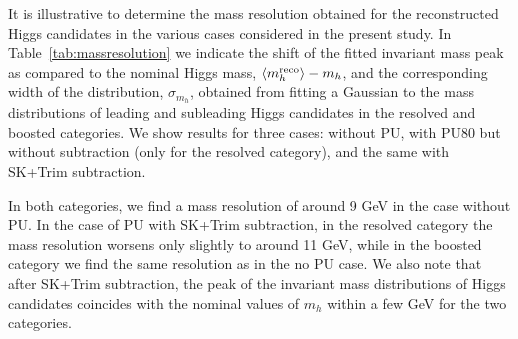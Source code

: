 It is illustrative to determine
the mass resolution obtained for the
reconstructed Higgs candidates in the various cases considered in
the present study.
%
In Table~\ref{tab:massresolution}
we indicate the shift of the fitted invariant mass peak as compared
to the nominal Higgs mass, $\left\langle m_h^{\rm reco}\right\rangle-m_h$,
and the corresponding width of the distribution, $\sigma_{m_h}$,
obtained from fitting a Gaussian to the mass distributions
of leading and subleading Higgs candidates in
the resolved and boosted categories.
        We show results for three cases: without PU, with PU80
        but without subtraction (only for the
        resolved category), and the same with SK+Trim subtraction.

        In both categories,
        we find a mass resolution of around 9 GeV in the case
        without PU.
        In the case of PU
        with SK+Trim subtraction,
        in the resolved category the mass resolution
        worsens only slightly
        to around 11 GeV, while in the boosted category we find
        the same resolution as in the no PU case.
        We also note that after SK+Trim subtraction, the peak of
        the invariant mass distributions of Higgs candidates
        coincides with the nominal values of $m_h$ within a few GeV
        for the two categories.

   
